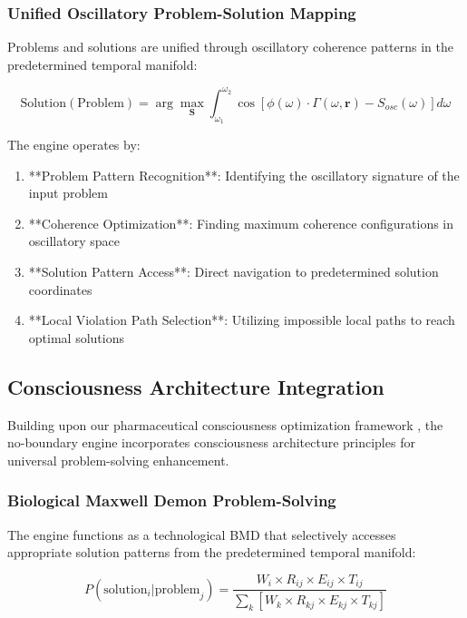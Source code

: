 \documentclass[11pt,a4paper]{article}
\theoremstyle{remark}
\begin{document}
\subsubsection{Unified Oscillatory Problem-Solution Mapping}

Problems and solutions are unified through oscillatory coherence patterns in the predetermined temporal manifold:

\begin{equation}
\text{Solution}(\text{Problem}) = \arg\max_{\mathbf{S}} \int_{\omega_1}^{\omega_2} \cos[\phi(\omega) \cdot \Gamma(\omega, \mathbf{r}) - S_{osc}(\omega)] d\omega
\end{equation}

The engine operates by:
\begin{enumerate}
\item **Problem Pattern Recognition**: Identifying the oscillatory signature of the input problem
\item **Coherence Optimization**: Finding maximum coherence configurations in oscillatory space
\item **Solution Pattern Access**: Direct navigation to predetermined solution coordinates
\item **Local Violation Path Selection**: Utilizing impossible local paths to reach optimal solutions
\end{enumerate}

\subsection{Consciousness Architecture Integration}

Building upon our pharmaceutical consciousness optimization framework \cite{sachikonye2024pharma}, the no-boundary engine incorporates consciousness architecture principles for universal problem-solving enhancement.

\subsubsection{Biological Maxwell Demon Problem-Solving}

The engine functions as a technological BMD that selectively accesses appropriate solution patterns from the predetermined temporal manifold:

\begin{equation}
P(\text{solution}_i | \text{problem}_j) = \frac{W_i \times R_{ij} \times E_{ij} \times T_{ij}}{\sum_k[W_k \times R_{kj} \times E_{kj} \times T_{kj}]}
\end{equation}
\end{document}
